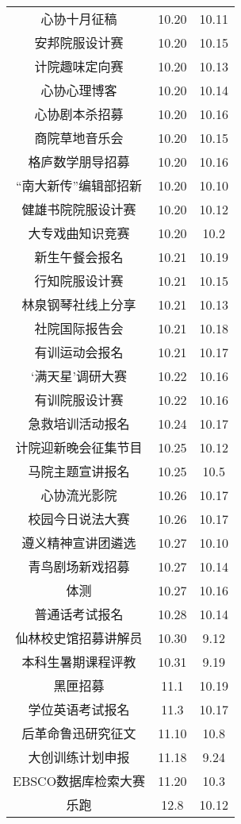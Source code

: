 \documentclass[letterpaper, 12pt]{article}
\begin{document}
\begin{multicols}{2}
{\begin{longtable}{|c|c|c|}
    心协十月征稿 & 10.20 & 10.11\\
    安邦院服设计赛 & 10.20 & 10.15\\
    计院趣味定向赛 & 10.20 & 10.13\\
    心协心理博客 & 10.20 & 10.14\\
    心协剧本杀招募 & 10.20 & 10.16\\
    商院草地音乐会 & 10.20 & 10.15\\
    格庐数学朋导招募 & 10.20 & 10.16\\
    “南大新传”编辑部招新 & 10.20 & 10.10\\
    健雄书院院服设计赛 & 10.20 & 10.12\\
    大专戏曲知识竞赛 & 10.20 & 10.2\\
    新生午餐会报名 & 10.21 & 10.19\\
    行知院服设计赛 & 10.21 & 10.15\\
    林泉钢琴社线上分享 & 10.21 & 10.13\\
    社院国际报告会 & 10.21 & 10.18\\
    有训运动会报名 & 10.21 & 10.17\\
     ‘满天星’调研大赛 & 10.22 & 10.16\\
    有训院服设计赛 & 10.22 & 10.16\\
    急救培训活动报名 & 10.24 & 10.17\\
    计院迎新晚会征集节目 & 10.25 & 10.12\\
    马院主题宣讲报名 & 10.25 & 10.5\\
    心协流光影院 & 10.26 & 10.17\\
    校园今日说法大赛 & 10.26 & 10.17\\
    遵义精神宣讲团遴选 & 10.27 & 10.10\\
    青鸟剧场新戏招募 & 10.27 & 10.14\\
    体测 & 10.27 & 10.16\\
    普通话考试报名 & 10.28 & 10.14\\
    仙林校史馆招募讲解员 & 10.30 & 9.12\\
    本科生暑期课程评教 & 10.31 & 9.19\\
    黑匣招募 & 11.1 & 10.19\\
    学位英语考试报名 & 11.3 & 10.17\\
    后革命鲁迅研究征文 & 11.10 & 10.8\\
    大创训练计划申报 & 11.18 & 9.24\\
    EBSCO数据库检索大赛 & 11.20 & 10.3\\    
    乐跑 & 12.8 & 10.12\\

    \hline
\end{longtable}
\unskip
\unpenalty
\unpenalty}\unvbox\colbbox
\end{multicols}
\end{document}
